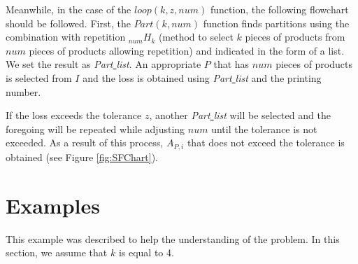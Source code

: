 Meanwhile, in the case of the ${loop}(k, z, num)$ function, the following flowchart should be followed.
First, the ${Part}(k, num)$ function finds partitions using the combination with repetition $_{num}H_{k}$ 
(method to select $k$ pieces of products from $num$ pieces of products allowing repetition) and indicated in the form of a list. 
We set the result as {\it Part\underline{ }list}. 
An appropriate $P$ that has $num$ pieces of products is selected from $I$ and the loss is obtained using {\it Part\underline{ }list} and the printing number.

If the loss exceeds the tolerance $z$, another {\it Part\underline{ }list} will be selected and the foregoing will be repeated 
while adjusting $num$ until the tolerance is not exceeded.
As a result of this process, $A_{P,i}$ that does not exceed the tolerance is obtained (see Figure \ref{fig:SFChart}).



\section{Examples}\label{sec:Exam}
This example was described to help the understanding of the problem. In this section, we assume that $k$ is equal to 4.

